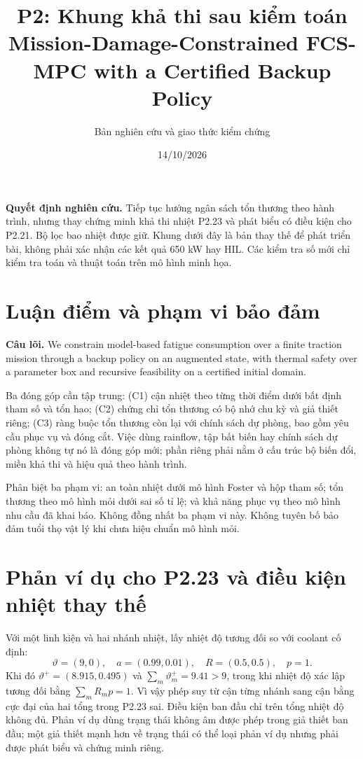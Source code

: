 \documentclass[11pt,a4paper]{article}
\title{P2: Khung khả thi sau kiểm toán\\\large Mission-Damage-Constrained FCS-MPC with a Certified Backup Policy}
\author{Bản nghiên cứu và giao thức kiểm chứng}
\date{14/10/2026}
\begin{document}
\maketitle

\textbf{Quyết định nghiên cứu.} Tiếp tục hướng ngân sách tổn thương theo hành trình, nhưng thay chứng minh khả thi nhiệt P2.23 và phát biểu có điều kiện cho P2.21. Bộ lọc bao nhiệt được giữ. Khung dưới đây là bản thay thế để phát triển bài, không phải xác nhận các kết quả 650 kW hay HIL. Các kiểm tra số mới chỉ kiểm tra toán và thuật toán trên mô hình minh họa.

\section{Luận điểm và phạm vi bảo đảm}
\textbf{Câu lõi.} We constrain model-based fatigue consumption over a finite traction mission through a backup policy on an augmented state, with thermal safety over a parameter box and recursive feasibility on a certified initial domain.

Ba đóng góp cần tập trung: (C1) cận nhiệt theo từng thời điểm dưới bất định tham số và tổn hao; (C2) chứng chỉ tổn thương có bộ nhớ chu kỳ và giả thiết riêng; (C3) ràng buộc tổn thương còn lại với chính sách dự phòng, bao gồm yêu cầu phục vụ và đóng cắt. Việc dùng rainflow, tập bất biến hay chính sách dự phòng không tự nó là đóng góp mới; phần riêng phải nằm ở cấu trúc bộ biến đổi, miền khả thi và hiệu quả theo hành trình.

Phân biệt ba phạm vi: an toàn nhiệt dưới mô hình Foster và hộp tham số; tổn thương theo mô hình mỏi dưới sai số tỉ lệ; và khả năng phục vụ theo mô hình nhu cầu đã khai báo. Không đồng nhất ba phạm vi này. Không tuyên bố bảo đảm tuổi thọ vật lý khi chưa hiệu chuẩn mô hình mỏi.

\section{Phản ví dụ cho P2.23 và điều kiện nhiệt thay thế}
Với một linh kiện và hai nhánh nhiệt, lấy nhiệt độ tương đối so với coolant cố định:
\[
\vartheta=(9,0),\quad a=(0.99,0.01),\quad R=(0.5,0.5),\quad p=1.
\]
Khi đó $\vartheta^+=(8.915,0.495)$ và $\sum_m\vartheta_m^+=9.41>9$, trong khi nhiệt độ xác lập tương đối bằng $\sum_m R_mp=1$. Vì vậy phép suy từ cận từng nhánh sang cận bằng cực đại của hai tổng trong P2.23 sai. Điều kiện ban đầu chỉ trên tổng nhiệt độ không đủ. Phản ví dụ dùng trạng thái không âm được phép trong giả thiết ban đầu; một giả thiết mạnh hơn về trạng thái có thể loại phản ví dụ nhưng phải được phát biểu và chứng minh riêng.
\end{document}

